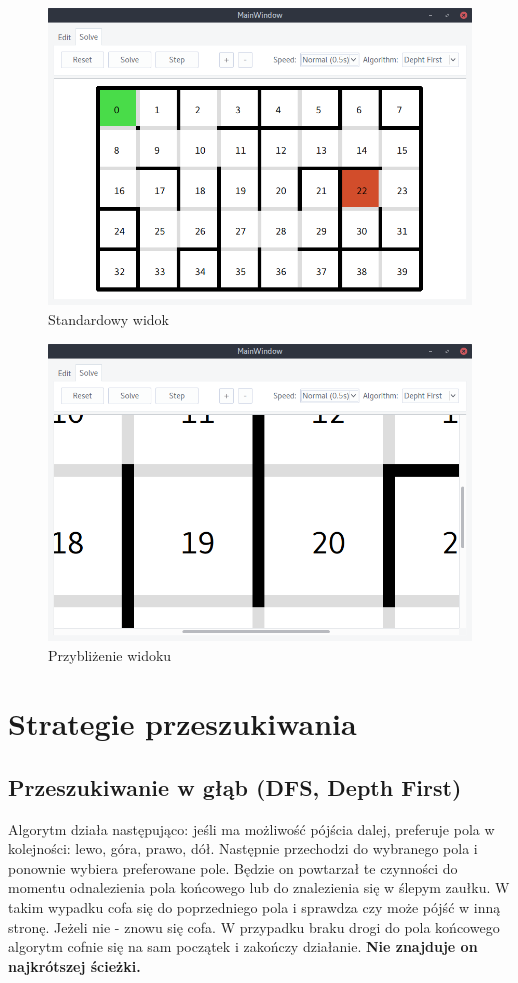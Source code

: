 \documentclass[12pt,a4paper]{article}
\begin{document}
	\begin{figure}[H]
		\centering
		\includegraphics[width=0.8\linewidth]{obrazki/12.png}
		\caption{Standardowy widok}
	\end{figure}
	
	\begin{figure}[H]
		\centering
		\includegraphics[width=0.8\linewidth]{obrazki/13.png}
		\caption{Przybliżenie widoku}
	\end{figure}
	
	
	\section{Strategie przeszukiwania}
	\subsection{Przeszukiwanie w głąb (DFS, Depth First)}
	Algorytm działa następująco: jeśli ma możliwość pójścia dalej,
	preferuje pola w kolejności: lewo, góra, prawo, dół. Następnie 
	przechodzi do wybranego pola i ponownie wybiera preferowane pole. 
	Będzie on powtarzał te czynności do momentu odnalezienia 
	pola końcowego lub do znalezienia się w ślepym zaułku. W takim	
	wypadku cofa się do poprzedniego pola i sprawdza czy może pójść w 
	inną stronę. Jeżeli nie - znowu się cofa. W przypadku braku
	drogi do pola końcowego algorytm cofnie się na sam początek i
	zakończy działanie. \textbf{Nie znajduje on najkrótszej ścieżki.}
	
\end{document}
